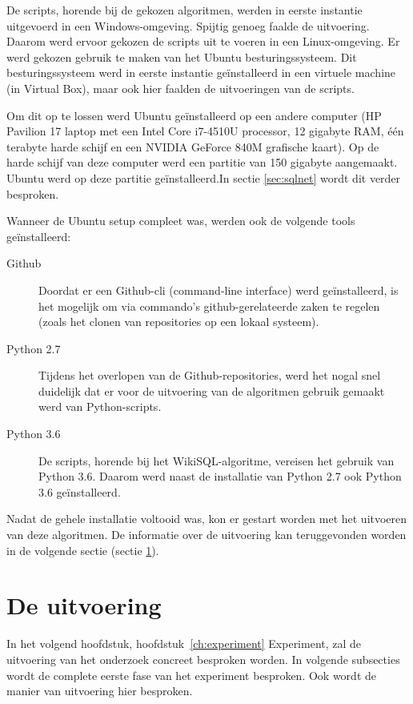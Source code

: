 De scripts, horende bij de gekozen algoritmen, werden in eerste instantie uitgevoerd in een Windows-omgeving. Spijtig genoeg faalde de uitvoering. Daarom werd ervoor gekozen de scripts uit te voeren in een Linux-omgeving. Er werd gekozen gebruik te maken van het Ubuntu besturingssysteem. Dit besturingssysteem werd in eerste instantie geïnstalleerd in een virtuele machine (in Virtual Box), maar ook hier faalden de uitvoeringen van de scripts. 

Om dit op te lossen werd Ubuntu geïnstalleerd op een andere computer (HP Pavilion 17 laptop met een Intel Core i7-4510U processor, 12 gigabyte RAM, één terabyte harde schijf en een NVIDIA GeForce 840M grafische kaart). Op de harde schijf van deze computer werd een partitie van 150 gigabyte aangemaakt. Ubuntu werd op deze partitie geïnstalleerd.In sectie \ref{sec:sqlnet} wordt dit verder besproken.

Wanneer de Ubuntu setup compleet was, werden ook de volgende tools geïnstalleerd:
\begin{description}
	\item[Github] Doordat er een Github-cli (command-line interface) werd geïnstalleerd, is het mogelijk om via commando's github-gerelateerde zaken te regelen (zoals het clonen van repositories op een lokaal systeem).
	\item[Python 2.7] Tijdens het overlopen van de Github-repositories, werd het nogal snel duidelijk dat er voor de uitvoering van de algoritmen gebruik gemaakt werd van Python-scripts.
	\item[Python 3.6] De scripts, horende bij het WikiSQL-algoritme, vereisen het gebruik van Python 3.6. Daarom werd naast de installatie van Python 2.7 ook Python 3.6 geïnstalleerd.
\end{description}

Nadat de gehele installatie voltooid was, kon er gestart worden met het uitvoeren van deze algoritmen. De informatie over de uitvoering kan teruggevonden worden in de volgende sectie (sectie \ref{sec:uitvoering}).

\section{De uitvoering}
\label{sec:uitvoering}

In het volgend hoofdstuk, hoofdstuk~\ref{ch:experiment} Experiment, zal de uitvoering van het onderzoek concreet besproken worden. In volgende subsecties wordt de complete eerste fase van het experiment besproken. Ook wordt de manier van uitvoering hier besproken.

